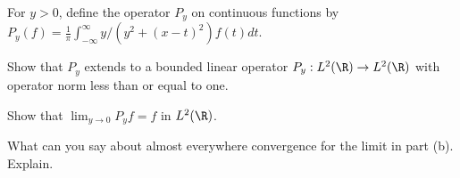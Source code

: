 For $y>0$, define the operator $P_y$ on continuous functions by
$P_y(f)=\frac{1}{\pi}\int_{-\infty}^{\infty}y/(y^2+(x-t)^2)f(t)dt$.
\begin{alist}
\item Show that $P_y$ extends to a bounded linear operator
$P_y:L^2(\R)\rightarrow L^2(\R)$ with operator norm less than or equal
to one.
\item Show that $\lim_{y\rightarrow 0}P_yf=f$ in $L^2(\R)$.
\item What can you say about almost everywhere convergence for the limit
in part (b). Explain.
\end{alist}

